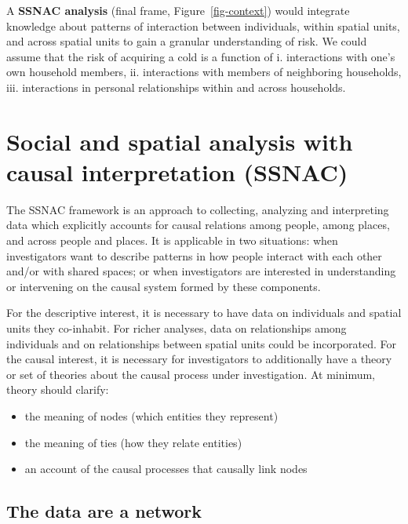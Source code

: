 \documentclass[
  letterpaper,
  DIV=11,
  numbers=noendperiod,
  oneside]{scrreprt}
\begin{document}
A \textbf{SSNAC analysis} (final frame, Figure~\ref{fig-context}) would
integrate knowledge about patterns of interaction between individuals,
within spatial units, and across spatial units to gain a granular
understanding of risk. We could assume that the risk of acquiring a cold
is a function of i. interactions with one's own household members, ii.
interactions with members of neighboring households, iii. interactions
in personal relationships within and across households.

\hypertarget{social-and-spatial-analysis-with-causal-interpretation-ssnac}{%
\section*{Social and spatial analysis with causal interpretation
(SSNAC)}\label{social-and-spatial-analysis-with-causal-interpretation-ssnac}}


The SSNAC framework is an approach to collecting, analyzing and
interpreting data which explicitly accounts for causal relations among
people, among places, and across people and places. It is applicable in
two situations: when investigators want to describe patterns in how
people interact with each other and/or with shared spaces; or when
investigators are interested in understanding or intervening on the
causal system formed by these components.

For the descriptive interest, it is necessary to have data on
individuals and spatial units they co-inhabit. For richer analyses, data
on relationships among individuals and on relationships between spatial
units could be incorporated. For the causal interest, it is necessary
for investigators to additionally have a theory or set of theories about
the causal process under investigation. At minimum, theory should
clarify:

\begin{itemize}
\item
  the meaning of nodes (which entities they represent)
\item
  the meaning of ties (how they relate entities)
\item
  an account of the causal processes that causally link nodes
\end{itemize}

\hypertarget{the-data-are-a-network}{%
\subsection*{The data are a network}\label{the-data-are-a-network}}
\end{document}
